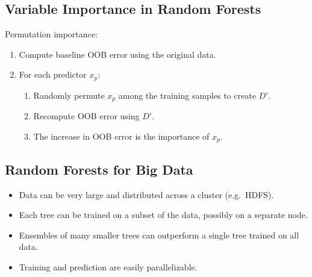 \documentclass[11pt]{article}
\begin{document}
\subsection{Variable Importance in Random Forests}

Permutation importance:
\begin{enumerate}
    \item Compute baseline OOB error using the original data.
    \item For each predictor $x_p$:
    \begin{enumerate}
        \item Randomly permute $x_p$ among the training samples to create $D'$.
        \item Recompute OOB error using $D'$.
        \item The increase in OOB error is the importance of $x_p$.
    \end{enumerate}
\end{enumerate}

\subsection{Random Forests for Big Data}

\begin{itemize}
    \item Data can be very large and distributed across a cluster (e.g.\ HDFS).
    \item Each tree can be trained on a subset of the data, possibly on a separate node.
    \item Ensembles of many smaller trees can outperform a single tree trained on all data.
    \item Training and prediction are easily parallelizable.
\end{itemize}
\end{document}
